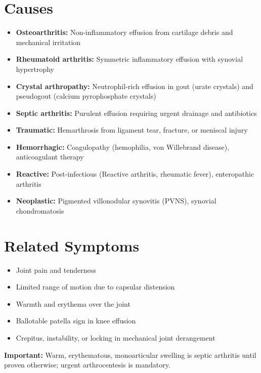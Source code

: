 \section*{Causes}
\begin{itemize}
  \item \textbf{Osteoarthritis:} Non-inflammatory effusion from cartilage debris and mechanical irritation
  \item \textbf{Rheumatoid arthritis:} Symmetric inflammatory effusion with synovial hypertrophy
  \item \textbf{Crystal arthropathy:} Neutrophil-rich effusion in gout (urate crystals) and pseudogout (calcium pyrophosphate crystals)
  \item \textbf{Septic arthritis:} Purulent effusion requiring urgent drainage and antibiotics
  \item \textbf{Traumatic:} Hemarthrosis from ligament tear, fracture, or meniscal injury
  \item \textbf{Hemorrhagic:} Coagulopathy (hemophilia, von Willebrand disease), anticoagulant therapy
  \item \textbf{Reactive:} Post-infectious (Reactive arthritis, rheumatic fever), enteropathic arthritis
  \item \textbf{Neoplastic:} Pigmented villonodular synovitis (PVNS), synovial chondromatosis
\end{itemize}

\section*{Related Symptoms}
\begin{itemize}
  \item Joint pain and tenderness
  \item Limited range of motion due to capsular distension
  \item Warmth and erythema over the joint
  \item Ballotable patella sign in knee effusion
  \item Crepitus, instability, or locking in mechanical joint derangement
\end{itemize}
\textbf{Important:} Warm, erythematous, monoarticular swelling is septic arthritis until proven otherwise; urgent arthrocentesis is mandatory.

